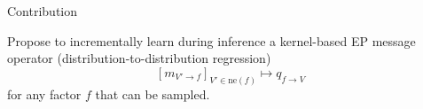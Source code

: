 \documentclass[english]{beamer}
\begin{document}
\newcommand{\Vskip}{\vspace{5mm}}
\begin{frame}


\begin{columns}[t]














\begin{block}{Contribution }

Propose to incrementally learn during inference a kernel-based EP message operator 
(distribution-to-distribution regression)
%
\begin{equation*}
    \left[ m_{V'\rightarrow f}  \right]_{V' \in \mathrm{ne}(f)} \mapsto q_{f \rightarrow V}
\end{equation*}
%
for any factor $f$ that can be sampled. 





\end{block}
\end{columns}
\end{frame}
\end{document}
